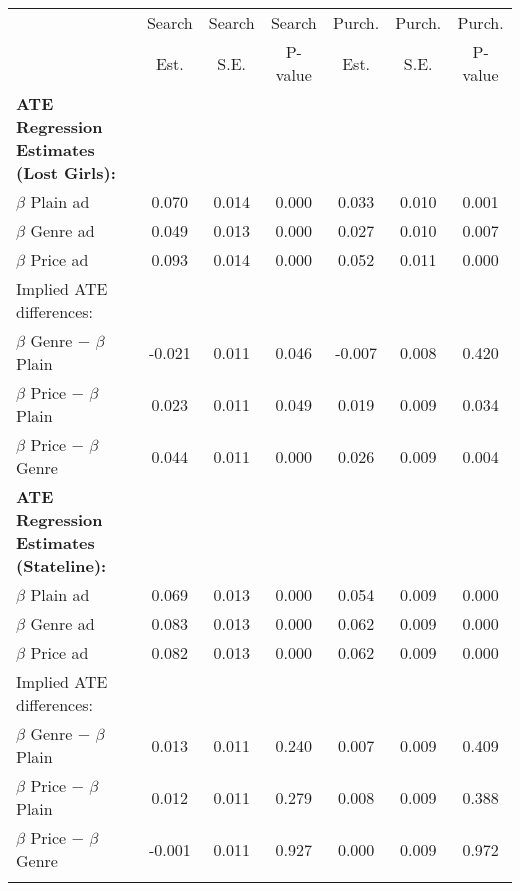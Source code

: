 \begin{center}
\begin{tabular}{lcccccc}
\hline \noalign{\smallskip} & Search & Search & Search & Purch. & Purch. & Purch.\\
 & Est. & S.E. & P-value & Est. & S.E. & P-value\\
\noalign{\smallskip}\hline \noalign{\smallskip}\textbf{ATE Regression Estimates (Lost Girls):} &  &  &  &  &  & \\
\hspace{5pt} $\beta$ Plain ad & 0.070 & 0.014 & 0.000 & 0.033 & 0.010 & 0.001\\
\hspace{5pt} $\beta$ Genre ad & 0.049 & 0.013 & 0.000 & 0.027 & 0.010 & 0.007\\
\hspace{5pt} $\beta$ Price ad & 0.093 & 0.014 & 0.000 & 0.052 & 0.011 & 0.000\\
Implied ATE differences: &  &  &  &  &  & \\
\hspace{5pt} $\beta$ Genre $-$ $\beta$ Plain & -0.021 & 0.011 & 0.046 & -0.007 & 0.008 & 0.420\\
\hspace{5pt} $\beta$ Price $-$ $\beta$ Plain & 0.023 & 0.011 & 0.049 & 0.019 & 0.009 & 0.034\\
\hspace{5pt} $\beta$ Price $-$ $\beta$ Genre & 0.044 & 0.011 & 0.000 & 0.026 & 0.009 & 0.004\\
\textbf{ATE Regression Estimates (Stateline):} &  &  &  &  &  & \\
\hspace{5pt} $\beta$ Plain ad & 0.069 & 0.013 & 0.000 & 0.054 & 0.009 & 0.000\\
\hspace{5pt} $\beta$ Genre ad & 0.083 & 0.013 & 0.000 & 0.062 & 0.009 & 0.000\\
\hspace{5pt} $\beta$ Price ad & 0.082 & 0.013 & 0.000 & 0.062 & 0.009 & 0.000\\
Implied ATE differences: &  &  &  &  &  & \\
\hspace{5pt} $\beta$ Genre $-$ $\beta$ Plain & 0.013 & 0.011 & 0.240 & 0.007 & 0.009 & 0.409\\
\hspace{5pt} $\beta$ Price $-$ $\beta$ Plain & 0.012 & 0.011 & 0.279 & 0.008 & 0.009 & 0.388\\
\hspace{5pt} $\beta$ Price $-$ $\beta$ Genre & -0.001 & 0.011 & 0.927 & 0.000 & 0.009 & 0.972\\
\noalign{\smallskip}\hline\end{tabular}\\
\end{center}
